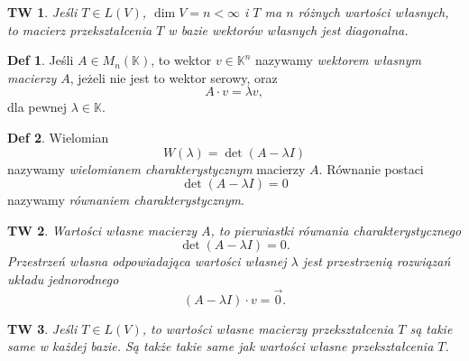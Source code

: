 \documentclass[a4paper, 12pt]{mwart}
\theoremstyle{definition}
\newtheorem{definicja}{Def}[section]
\theoremstyle{plain}
\newtheorem{twierdzenie}{TW}[section]
\theoremstyle{remark}
\begin{document}
\begin{twierdzenie}
	Jeśli $T \in L(V)$, $\dim V = n < \infty$ i $T$ ma $n$ różnych wartości własnych, to macierz przekształcenia $T$ w bazie wektorów własnych jest diagonalna.
\end{twierdzenie}
\begin{definicja}
	Jeśli $A \in M_n(\mathbb{K})$, to wektor $v \in \mathbb{K}^n$ nazywamy \emph{wektorem własnym macierzy $A$}, jeżeli nie jest to wektor serowy, oraz
	\begin{equation}
		A \cdot v = \lambda v,
	\end{equation}
	dla pewnej $\lambda \in \mathbb{K}$.
\end{definicja}
\begin{definicja}
	Wielomian
	\begin{equation}
		W(\lambda) = \det (A - \lambda I)
	\end{equation}
	nazywamy \emph{wielomianem charakterystycznym} macierzy $A$. Równanie postaci
	\begin{equation}
		\det (A - \lambda I) = 0
	\end{equation}
	nazywamy \emph{równaniem charakterystycznym}.
\end{definicja}
\begin{twierdzenie}
	Wartości własne macierzy $A$, to pierwiastki równania charakterystycznego
	\begin{equation}
		\det (A - \lambda I) = 0.
	\end{equation}
	Przestrzeń własna odpowiadająca wartości własnej $\lambda$ jest przestrzenią rozwiązań układu jednorodnego
	\begin{equation}
		(A - \lambda I) \cdot v = \vec 0.
	\end{equation}
\end{twierdzenie}
\begin{twierdzenie} %
	Jeśli $T \in L(V)$, to wartości własne macierzy przekształcenia $T$ są takie same w każdej bazie. Są także takie same jak wartości własne przekształcenia $T$.
\end{twierdzenie}
\end{document}
